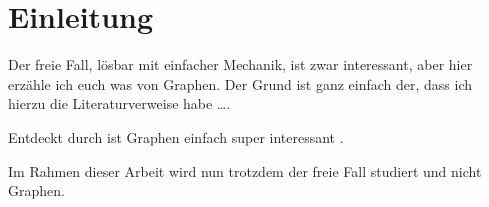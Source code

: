 
\chapter{Einleitung}
\setcounter{page}{1}

Der freie Fall, lösbar mit einfacher Mechanik, ist zwar interessant, aber
hier erzähle ich euch was von Graphen. Der Grund ist ganz einfach der, dass ich hierzu die Literaturverweise habe \dots.

Entdeckt durch \citeauthor{Novoselov2004} ist Graphen einfach super interessant \cite{Novoselov2004,Novoselov2005,Geim2007}.

\Blindtext

Im Rahmen dieser Arbeit wird  nun trotzdem der freie Fall studiert und nicht
Graphen.
